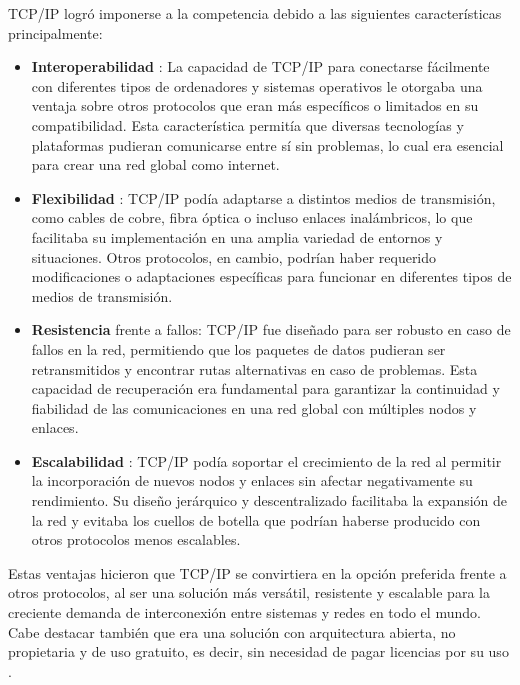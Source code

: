 TCP/IP logró imponerse a la competencia debido a las siguientes características principalmente:
\begin{itemize}
      \item \textbf{ Interoperabilidad }: La capacidad de TCP/IP para conectarse fácilmente con diferentes tipos de ordenadores y sistemas operativos le otorgaba una ventaja sobre otros protocolos que eran más específicos o limitados en su compatibilidad. Esta característica permitía que diversas tecnologías y plataformas pudieran comunicarse entre sí sin problemas, lo cual era esencial para crear una red global como internet.

      \item \textbf{ Flexibilidad }: TCP/IP podía adaptarse a distintos medios de transmisión, como cables de cobre, fibra óptica o incluso enlaces inalámbricos, lo que facilitaba su implementación en una amplia variedad de entornos y situaciones. Otros protocolos, en cambio, podrían haber requerido modificaciones o adaptaciones específicas para funcionar en diferentes tipos de medios de transmisión.

      \item \textbf{ Resistencia }frente a fallos: TCP/IP fue diseñado para ser robusto en caso de fallos en la red, permitiendo que los paquetes de datos pudieran ser retransmitidos y encontrar rutas alternativas en caso de problemas. Esta capacidad de recuperación era fundamental para garantizar la continuidad y fiabilidad de las comunicaciones en una red global con múltiples nodos y enlaces.

      \item \textbf{ Escalabilidad }: TCP/IP podía soportar el crecimiento de la red al permitir la incorporación de nuevos nodos y enlaces sin afectar negativamente su rendimiento. Su diseño jerárquico y descentralizado facilitaba la expansión de la red y evitaba los cuellos de botella que podrían haberse producido con otros protocolos menos escalables.

\end{itemize}

Estas ventajas hicieron que TCP/IP se convirtiera en la opción preferida frente a otros protocolos, al ser una solución más versátil,
resistente y escalable para la creciente demanda de interconexión entre sistemas y redes en todo el mundo.
Cabe destacar también que era una solución con arquitectura abierta, no propietaria y de uso gratuito, es decir, sin necesidad de pagar licencias por su uso \cite{edwardsFoundationInternetTCP2021}.

